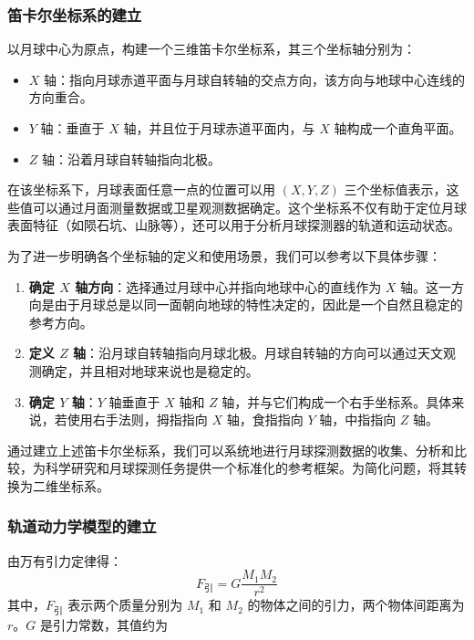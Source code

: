 \documentclass{ctexart}
\begin{document}
    \subsubsection{笛卡尔坐标系的建立}
以月球中心为原点，构建一个三维笛卡尔坐标系，其三个坐标轴分别为：

\begin{itemize}
    \item \(X\) 轴：指向月球赤道平面与月球自转轴的交点方向，该方向与地球中心连线的方向重合。
    \item \(Y\) 轴：垂直于 \(X\) 轴，并且位于月球赤道平面内，与 \(X\) 轴构成一个直角平面。
    \item \(Z\) 轴：沿着月球自转轴指向北极。
\end{itemize}

在该坐标系下，月球表面任意一点的位置可以用 \((X, Y, Z)\) 三个坐标值表示，这些值可以通过月面测量数据或卫星观测数据确定。这个坐标系不仅有助于定位月球表面特征（如陨石坑、山脉等），还可以用于分析月球探测器的轨道和运动状态。

为了进一步明确各个坐标轴的定义和使用场景，我们可以参考以下具体步骤：

\begin{enumerate}
    \item \textbf{确定 \(X\) 轴方向}：选择通过月球中心并指向地球中心的直线作为 \(X\) 轴。这一方向是由于月球总是以同一面朝向地球的特性决定的，因此是一个自然且稳定的参考方向。
    \item \textbf{定义 \(Z\) 轴}：沿月球自转轴指向月球北极。月球自转轴的方向可以通过天文观测确定，并且相对地球来说也是稳定的。
    \item \textbf{确定 \(Y\) 轴}：\(Y\) 轴垂直于 \(X\) 轴和 \(Z\) 轴，并与它们构成一个右手坐标系。具体来说，若使用右手法则，拇指指向 \(X\) 轴，食指指向 \(Y\) 轴，中指指向 \(Z\) 轴。
\end{enumerate}

通过建立上述笛卡尔坐标系，我们可以系统地进行月球探测数据的收集、分析和比较，为科学研究和月球探测任务提供一个标准化的参考框架。为简化问题，将其转换为二维坐标系。
    \subsubsection{轨道动力学模型的建立}


由万有引力定律得：
\begin{equation}
F_{\text{引}} = G \frac{M_1 M_2}{r^2}
\label{eq:gravity}
\end{equation}
其中，\( F_{\text{引}}\) 表示两个质量分别为 \( M_1 \) 和 \( M_2 \) 的物体之间的引力，两个物体间距离为 \( r \)。\( G \) 是引力常数，其值约为 
\end{document}
